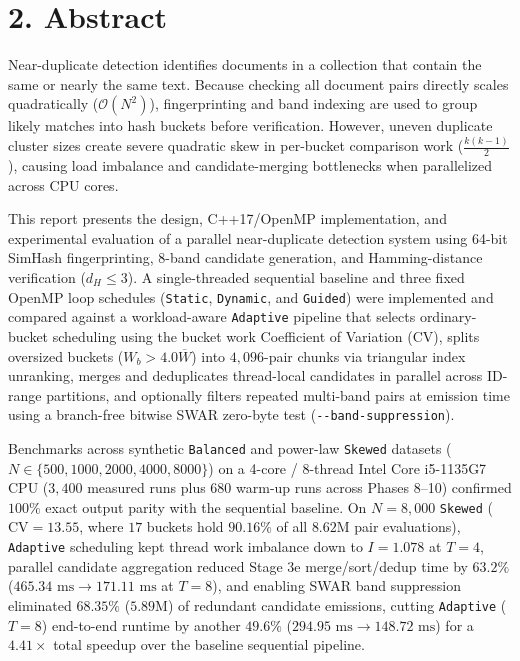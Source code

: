 \documentclass[11pt,a4paper]{article}
\renewcommand{\_}{\textunderscore\allowbreak}
\newcommand{\tocsection}[1]{%
  \phantomsection%
  \section*{#1}%
  \addcontentsline{toc}{section}{#1}%
}
\begin{document}
\setcounter{page}{2}
{\setlength{\parskip}{0.12em}\tableofcontents}
\clearpage

\tocsection{2. Abstract}

Near-duplicate detection identifies documents in a collection that contain the same or nearly the same text. Because checking all document pairs directly scales quadratically ($\mathcal{O}(N^2)$), fingerprinting and band indexing are used to group likely matches into hash buckets before verification. However, uneven duplicate cluster sizes create severe quadratic skew in per-bucket comparison work ($\frac{k(k-1)}{2}$), causing load imbalance and candidate-merging bottlenecks when parallelized across CPU cores.

This report presents the design, C++17/OpenMP implementation, and experimental evaluation of a parallel near-duplicate detection system using 64-bit SimHash fingerprinting, 8-band candidate generation, and Hamming-distance verification ($d_H \le 3$). A single-threaded sequential baseline and three fixed OpenMP loop schedules (\texttt{Static}, \texttt{Dynamic}, and \texttt{Guided}) were implemented and compared against a workload-aware \texttt{Adaptive} pipeline that selects ordinary-bucket scheduling using the bucket work Coefficient of Variation ($\text{CV}$), splits oversized buckets ($W_b > 4.0\overline{W}$) into $4,096$-pair chunks via triangular index unranking, merges and deduplicates thread-local candidates in parallel across ID-range partitions, and optionally filters repeated multi-band pairs at emission time using a branch-free bitwise SWAR zero-byte test (\texttt{-{}-band-suppression}).

Benchmarks across synthetic \texttt{Balanced} and power-law \texttt{Skewed} datasets ($N \in \{500,\allowbreak 1000,\allowbreak 2000,\allowbreak 4000,\allowbreak 8000\}$) on a 4-core / 8-thread Intel Core i5-1135G7 CPU ($3,400$ measured runs plus $680$ warm-up runs across Phases 8--10) confirmed $100\%$ exact output parity with the sequential baseline. On $N = 8,000$ \texttt{Skewed} ($\text{CV} = 13.55$, where $17$ buckets hold $90.16\%$ of all $8.62\text{M}$ pair evaluations), \texttt{Adaptive} scheduling kept thread work imbalance down to $I = 1.078$ at $T=4$, parallel candidate aggregation reduced Stage 3e merge/sort/dedup time by $63.2\%$ ($465.34\text{ ms} \to 171.11\text{ ms}$ at $T=8$), and enabling SWAR band suppression eliminated $68.35\%$ ($5.89\text{M}$) of redundant candidate emissions, cutting \texttt{Adaptive} ($T=8$) end-to-end runtime by another $49.6\%$ ($294.95\text{ ms} \to 148.72\text{ ms}$) for a $4.41\times$ total speedup over the baseline sequential pipeline.
\end{document}
